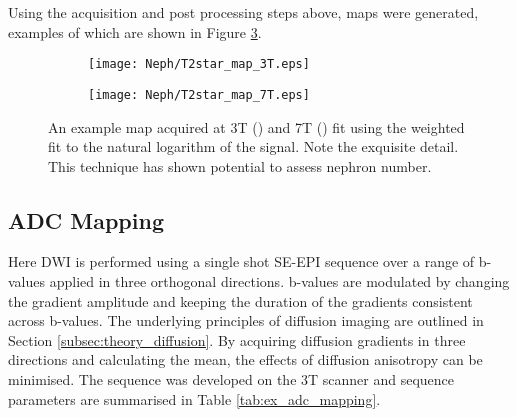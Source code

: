 \newpage
Using the acquisition and post processing steps above, \ttwostar maps were generated, examples of which are shown in Figure \ref{fig:ex_t2star_maps}.

\begin{figure}[H]
	\centering
	\begin{subfigure}[c]{0.47\textwidth}
		\centering
		\texttt{[image: Neph/T2star\_map\_3T.eps]}
		\caption{}
		\label{fig:ex_t2star_map_3t}
	\end{subfigure}
	\hfill
	\begin{subfigure}[c]{0.47\textwidth}
		\centering
		\texttt{[image: Neph/T2star\_map\_7T.eps]}
		\caption{}
		\label{fig:ex_t2star_map_7t}
	\end{subfigure}
	\caption{An example \ttwostar map acquired at 3T () and 7T () fit using the weighted fit to the natural logarithm of the signal. Note the exquisite detail. This technique has shown potential to assess nephron number.}
	\label{fig:ex_t2star_maps}
\end{figure}

\subsection{\acl*{ADC} Mapping}
\label{subsec:ex_adc}

Here \ac{DWI} is performed using a single shot \ac{SE}-\ac{EPI} sequence over a range of b-values applied in three orthogonal directions. b-values are modulated by changing the gradient amplitude and keeping the duration of the gradients consistent across b-values. The underlying principles of diffusion imaging are outlined in Section \ref{subsec:theory_diffusion}. By acquiring diffusion gradients in three directions and calculating the mean, the effects of diffusion anisotropy can be minimised. The sequence was developed on the 3T scanner and sequence parameters are summarised in Table \ref{tab:ex_adc_mapping}. 

